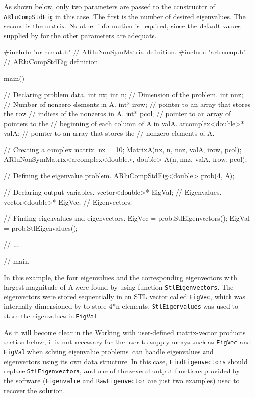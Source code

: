 As shown below, only two parameters are passed to the constructor of \texttt{ARluCompStdEig} in this case. The first is the number of desired eigenvalues. The second is the matrix. No other information is required, since the default values supplied by \ARPP{} for the other parameters are adequate.

\begin{cppcode}
#include "arlnsmat.h" // ARluNonSymMatrix definition.
#include "arlscomp.h" // ARluCompStdEig definition.

main()
{
	// Declaring problem data.
	int                nx;
	int                n;      // Dimension of the problem.
	int                nnz;    // Number of nonzero elements in A.
	int*               irow;   // pointer to an array that stores the row
	                           // indices of the nonzeros in A.
	int*               pcol;   // pointer to an array of pointers to the
	                           // beginning of each column of A in valA.
	arcomplex<double>*   valA; // pointer to an array that stores the
	                           // nonzero elements of A.
	
	// Creating a complex matrix.
	nx = 10;
	MatrixA(nx, n, nnz, valA, irow, pcol);
	ARluNonSymMatrix<arcomplex<double>, double> A(n, nnz, valA, irow, pcol);
	
	// Defining the eigenvalue problem. 
	ARluCompStdEig<double> prob(4, A); 
	
	// Declaring output variables.
	vector<double>* EigVal;   // Eigenvalues.
	vector<double>* EigVec;   // Eigenvectors.
	
	// Finding eigenvalues and eigenvectors.
	EigVec = prob.StlEigenvectors();
	EigVal = prob.StlEigenvalues();
	
	// ...
} // main.
\end{cppcode}

In this example, the four eigenvalues and the corresponding eigenvectors with largest magnitude of A were found by using function \texttt{StlEigenvectors}. The eigenvectors were stored sequentially in an STL vector called \texttt{EigVec}, which was internally dimensioned by \ARPP{} to store 4*n elements. \texttt{StlEigenvalues} was used to store the eigenvalues in \texttt{EigVal}.

As it will become clear in the Working with user-defined matrix-vector products section below, it is not necessary for the user to supply arrays such as \texttt{EigVec} and \texttt{EigVal} when solving eigenvalue problems. \ARPP{} can handle eigenvalues and eigenvectors using its own data structure. In this case, \texttt{FindEigenvectors} should replace \texttt{StlEigenvectors}, and one of the several output functions provided by the software (\texttt{Eigenvalue} and \texttt{RawEigenvector} are just two examples) used to recover the solution.

